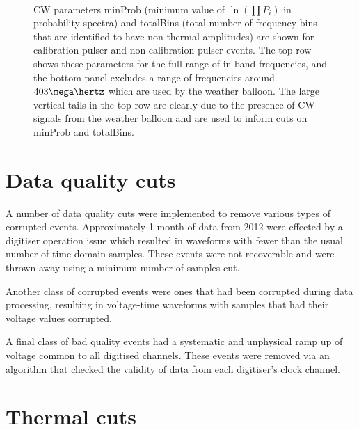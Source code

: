 \begin{figure}[htpb]
  \hfill
  \\
  \hfill
  \caption{CW parameters minProb (minimum value of $\ln(\prod P_{i})$ in probability spectra) and totalBins (total number of frequency bins that are identified to have non-thermal amplitudes) are shown for calibration pulser and non-calibration pulser events. The top row shows these parameters for the full range of in band frequencies, and the bottom panel excludes a range of frequencies around $403 \mega \hertz$ which are used by the weather balloon. The large vertical tails in the top row are clearly due to the presence of CW signals from the weather balloon and are used to inform cuts on minProb and totalBins.}
  \label{fig:analysis:CWRemoval:Filtering:CW-MinProb-TotalBins}
\end{figure}


\section{Data quality cuts}
\label{sec:Analysis:Data-Quality-Cuts}

A number of data quality cuts were implemented to remove various types of corrupted events. Approximately 1 month of data from 2012 were effected by a digitiser operation issue which resulted in waveforms with fewer than the usual number of time domain samples. These events were not recoverable and were thrown away using a minimum number of samples cut.

Another class of corrupted events were ones that had been corrupted during data processing, resulting in voltage-time waveforms with samples that had their voltage values corrupted.

A final class of bad quality events had a systematic and unphysical ramp up of voltage common to all digitised channels. These events were removed via an algorithm that checked the validity of data from each digitiser's clock channel.


\section{Thermal cuts}
\label{sec:Analysis:Thermal-Cuts}

